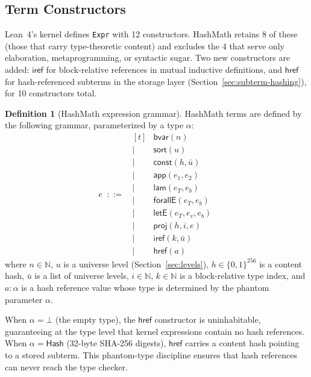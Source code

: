 \documentclass[11pt]{article}
\theoremstyle{definition}
\newtheorem{definition}{Definition}[section]
\theoremstyle{plain}
\theoremstyle{remark}
\newcommand{\bvar}{\textsf{bvar}}
\newcommand{\const}{\textsf{const}}
\newcommand{\app}{\textsf{app}}
\newcommand{\lam}{\textsf{lam}}
\newcommand{\forallE}{\textsf{forallE}}
\newcommand{\letE}{\textsf{letE}}
\newcommand{\proj}{\textsf{proj}}
\newcommand{\sort}{\textsf{sort}}
\newcommand{\hrefE}{\textsf{href}}
\begin{document}
\subsection{Term Constructors}
\label{sec:terms}

Lean~4's kernel defines \texttt{Expr} with 12 constructors.
HashMath retains 8 of these (those that carry type-theoretic content) and excludes the
4 that serve only elaboration, metaprogramming, or syntactic sugar.
Two new constructors are added: $\textsf{iref}$ for block-relative references in mutual
inductive definitions, and $\hrefE$ for hash-referenced subterms in the storage layer
(Section~\ref{sec:subterm-hashing}), for 10 constructors total.

\begin{definition}[HashMath expression grammar]
\label{def:expr}
HashMath terms are defined by the following grammar, parameterized by a type $\alpha$:
\[
  e \;\;::=\;\;
    \begin{aligned}[t]
      &\bvar(n) \\
      \mid\;\; &\sort(u) \\
      \mid\;\; &\const(h, \bar{u}) \\
      \mid\;\; &\app(e_1, e_2) \\
      \mid\;\; &\lam(e_T, e_b) \\
      \mid\;\; &\forallE(e_T, e_b) \\
      \mid\;\; &\letE(e_T, e_v, e_b) \\
      \mid\;\; &\proj(h, i, e) \\
      \mid\;\; &\textsf{iref}(k, \bar{u}) \\
      \mid\;\; &\hrefE(a)
    \end{aligned}
\]
where $n \in \mathbb{N}$, $u$ is a universe level (Section~\ref{sec:levels}),
$h \in \{0,1\}^{256}$ is a content hash, $\bar{u}$ is a list of universe levels,
$i \in \mathbb{N}$, $k \in \mathbb{N}$ is a block-relative type index,
and $a : \alpha$ is a hash reference value whose type is determined by the phantom parameter $\alpha$.

When $\alpha = \bot$ (the empty type), the $\hrefE$ constructor is uninhabitable,
guaranteeing at the type level that kernel expressions contain no hash references.
When $\alpha = \textsf{Hash}$ (32-byte SHA-256 digests), $\hrefE$ carries a content hash
pointing to a stored subterm.
This phantom-type discipline ensures that hash references can never reach the type checker.
\end{definition}
\end{document}
